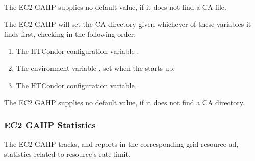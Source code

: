 The EC2 GAHP supplies no default value, if it does not find a CA file.

The EC2 GAHP will set the CA directory given whichever of these
variables it finds first, checking in the following order:

\begin{enumerate}
\item The HTCondor configuration variable .
\item The environment variable ,
  set when the  starts up.
\item The HTCondor configuration variable .
\end{enumerate}

The EC2 GAHP supplies no default value, if it does not find a CA directory.

\subsubsection{\label{sec:Amazon-statistics}EC2 GAHP Statistics}

The EC2 GAHP tracks, and reports in the corresponding grid resource ad,
statistics related to resource's rate limit.


